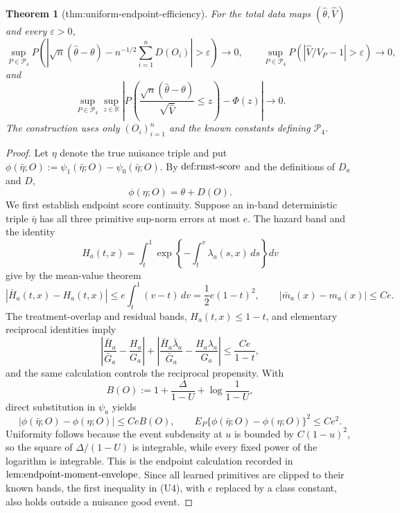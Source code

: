 \documentclass{article}
\newtheorem{theorem}{Theorem}
\begin{document}
\begin{theorem}[thm:uniform-endpoint-efficiency]\label{thm:uniform-endpoint-efficiency}
For the total data maps \((\widehat\theta,\widehat V)\) and every \(\varepsilon>0\), \[\sup_{P\in\mathcal P_4}P\!\left(\left|\sqrt n(\widehat\theta-\theta)-n^{-1/2}\sum_{i=1}^nD(O_i)\right|>\varepsilon\right)\to0,\qquad \sup_{P\in\mathcal P_4}P\!\left(\left|\widehat V/V_P-1\right|>\varepsilon\right)\to0,\] and \[\sup_{P\in\mathcal P_4}\sup_{z\in\mathbb R}\left|P\!\left(\frac{\sqrt n(\widehat\theta-\theta)}{\sqrt{\widehat V}}\le z\right)-\Phi(z)\right|\to0.\] The construction uses only \((O_i)_{i=1}^n\) and the known constants defining \(\mathcal P_4\).
\end{theorem}
\begin{proof}
Let \(\eta\) denote the true nuisance triple and put \(\phi(\bar\eta;O):=\psi_1(\bar\eta;O)-\psi_0(\bar\eta;O)\).  By \(\textnormal{def:rmst-score}\) and the definitions of \(D_a\) and \(D\),
\[
 \phi(\eta;O)=\theta+D(O).                                             \tag{U1}
\]
We first establish endpoint score continuity.  Suppose an in-band deterministic triple \(\bar\eta\) has all three primitive sup-norm errors at most \(e\).  The hazard band and the identity
\[
 H_a(t,x)=\int_t^1\exp\!\left\{-\int_t^v\lambda_a(s,x)\,ds\right\}dv
\]
give by the mean-value theorem
\[
 |\bar H_a(t,x)-H_a(t,x)|\le e\int_t^1(v-t)\,dv
 =\frac12e(1-t)^2,\qquad |\bar m_a(x)-m_a(x)|\le Ce.                   \tag{U2}
\]
The treatment-overlap and residual bands, \(H_a(t,x)\le1-t\), and elementary reciprocal identities imply
\[
 \left|\frac{\bar H_a}{\bar G_a}-\frac{H_a}{G_a}\right|
 +\left|\frac{\bar H_a\bar\lambda_a}{\bar G_a}
       -\frac{H_a\lambda_a}{G_a}\right|
 \le\frac{Ce}{1-t},                                                    \tag{U3}
\]
and the same calculation controls the reciprocal propensity.  With
\[
 B(O):=1+\frac{\Delta}{1-U}+\log\frac1{1-U},
\]
direct substitution in \(\psi_a\) yields
\[
 |\phi(\bar\eta;O)-\phi(\eta;O)|\le CeB(O),
 \qquad E_P\{\phi(\bar\eta;O)-\phi(\eta;O)\}^2\le Ce^2.              \tag{U4}
\]
Uniformity follows because the event subdensity at \(u\) is bounded by \(C(1-u)^2\), so the square of \(\Delta/(1-U)\) is integrable, while every fixed power of the logarithm is integrable.  This is the endpoint calculation recorded in \(\textnormal{lem:endpoint-moment-envelope}\).  Since all learned primitives are clipped to their known bands, the first inequality in (U4), with \(e\) replaced by a class constant, also holds outside a nuisance good event.


\end{proof}
\end{document}
